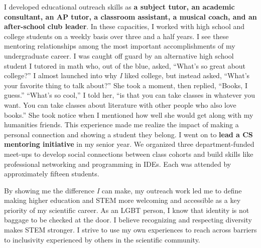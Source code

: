 \noindent
\underline{}
I developed educational outreach skills as \textbf{a subject tutor, an academic consultant, an AP tutor, a classroom assistant, a musical coach, and an after-school club leader}.
In these capacities, I worked with high school and college students on a weekly basis over three and a half years.
I see these mentoring relationships among the most important accomplishments of my undergraduate career.
I was caught off guard by an alternative high school student I tutored in math who, out of the blue, asked, ``What's so great about college?''
I almost launched into why \textit{I} liked college, but instead asked, ``What's your favorite thing to talk about?''
She took a moment, then replied, ``Books, I guess.''
``What's so cool,'' I told her, ``is that you can take classes in whatever you want.
You can take classes about literature with other people who also love books.''
She took notice when I mentioned how well she would get along with my humanities friends.
This experience made me realize the impact of making a personal connection and showing a student they belong.
I went on to \textbf{lead a CS mentoring initiative} in my senior year.
We organized three department-funded meet-ups to develop social connections between class cohorts and build skills like professional networking and programming in IDEs.
Each was attended by approximately fifteen students.

By showing me the difference \textit{I} can make, my outreach work
led me to define making higher education and STEM more welcoming and accessible as a key priority of my scientific career.
As an LGBT person, I know that identity is not baggage to be checked at the door.
I believe recognizing and respecting diversity makes STEM stronger.
I strive to use my own experiences to reach across barriers to inclusivity experienced by others in the scientific community.
